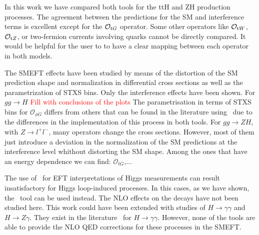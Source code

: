In this work we have compared both tools for the ttH and ZH production processes. The agreement between the predictions for the SM and interference terms is excellent except for the $\mathcal{O}_{\textrm tG}$ operator. Some other operators like $\mathcal{O}_{\textrm tW}$, $\mathcal{O}_{\textrm tZ}$, or two-fermion currents involving quarks cannot be directly compared. It would be helpful for the user to to have a clear mapping between each operator in both models.

The SMEFT effects have been studied by means of the distortion of the SM prediction shape and normalization in differential cross sections as well as the parametrization of STXS bins. Only the interference effects have been shown. For $gg\to H$
\textcolor{red}{Fill with conclusions of the plots}
The parametrisation in terms of STXS bins for $\mathcal{O}_{\phi G}$ differs from others that can be found in the literature using \SMEFTsim\ due to the differences in the implementation of this process in both tools.
For $gg\to ZH$, with $Z\to l^{+}l^{-}$,  many operators change the cross sections. However, most of them just introduce a deviation in the normalization of the SM predictions at the interference level whithout distorting the SM shape. Among the ones that have an energy dependence we can find: $\mathcal{O}_{tG}$,...

The use of \SMEFTsim\ for EFT interpretations of Higgs measurements can result insatisfactory for Higgs loop-induced processes. In this cases, as we have shown, the \SMEFTatNLO\ tool can be used instead. The NLO effects on the decays have not been studied here. This work could have been extended with studies of $H\to \gamma\gamma$ and $ H\to Z\gamma$. They exist in the literature~\cite{Dawson:2018liq} for $H\to \gamma\gamma$. However, none of the tools are able to provide the NLO QED corrections for these processes in the SMEFT.



~\newline~

\let\Herwig\undefined
\let\Pythia\undefined
\let\Sherpa\undefined
\let\Rivet\undefined
\let\Professor\undefined
\let\eps\undefined
\let\mc\undefined
\let\mr\undefined
\let\mb\undefined
\let\tm\undefined




